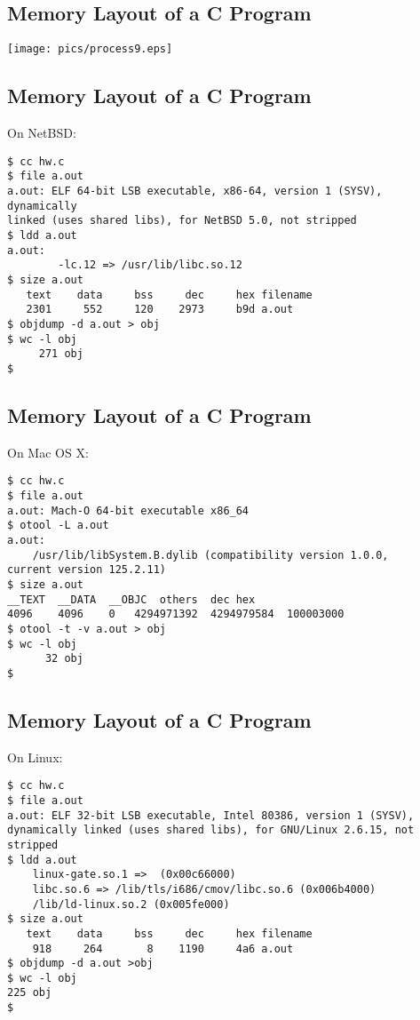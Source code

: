 \documentclass[xga]{xdvislides}
\begin{document}
\subsection{Memory Layout of a C Program}
\begin{center}
	\texttt{[image: pics/process9.eps]}
\end{center}

\subsection{Memory Layout of a C Program}
On NetBSD:
\begin{verbatim}
$ cc hw.c
$ file a.out
a.out: ELF 64-bit LSB executable, x86-64, version 1 (SYSV), dynamically
linked (uses shared libs), for NetBSD 5.0, not stripped
$ ldd a.out
a.out:
        -lc.12 => /usr/lib/libc.so.12
$ size a.out
   text    data     bss     dec     hex filename
   2301     552     120    2973     b9d a.out
$ objdump -d a.out > obj
$ wc -l obj
     271 obj
$
\end{verbatim}

\subsection{Memory Layout of a C Program}
On Mac OS X:
\begin{verbatim}
$ cc hw.c
$ file a.out
a.out: Mach-O 64-bit executable x86_64
$ otool -L a.out
a.out:
	/usr/lib/libSystem.B.dylib (compatibility version 1.0.0,
current version 125.2.11)
$ size a.out
__TEXT	__DATA	__OBJC	others	dec	hex
4096	4096	0	4294971392	4294979584	100003000
$ otool -t -v a.out > obj
$ wc -l obj
      32 obj
$
\end{verbatim}

\subsection{Memory Layout of a C Program}
On Linux:
\begin{verbatim}
$ cc hw.c
$ file a.out
a.out: ELF 32-bit LSB executable, Intel 80386, version 1 (SYSV),
dynamically linked (uses shared libs), for GNU/Linux 2.6.15, not stripped
$ ldd a.out
	linux-gate.so.1 =>  (0x00c66000)
	libc.so.6 => /lib/tls/i686/cmov/libc.so.6 (0x006b4000)
	/lib/ld-linux.so.2 (0x005fe000)
$ size a.out
   text	   data	    bss	    dec	    hex	filename
    918	    264	      8	   1190	    4a6	a.out
$ objdump -d a.out >obj
$ wc -l obj
225 obj
$
\end{verbatim}
\end{document}
